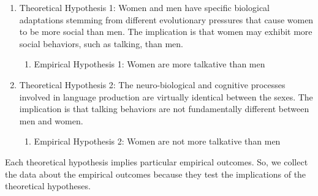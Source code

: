 \begin{enumerate}
\item Theoretical Hypothesis 1: Women and men have specific biological adaptations stemming from different evolutionary pressures that cause women to be more social than men. The implication is that women may exhibit more social behaviors, such as talking, than men.
	\begin{enumerate}
	\item Empirical Hypothesis 1: Women are more talkative than men
	\end{enumerate}
\item Theoretical Hypothesis 2: The neuro-biological and cognitive processes involved in language production are virtually identical between the sexes. The implication is that talking behaviors are not fundamentally different between men and women.
	\begin{enumerate}
	\item Empirical Hypothesis 2: Women are not more talkative than men
	\end{enumerate}
\end{enumerate}

Each theoretical hypothesis implies particular empirical outcomes. So, we collect the data about the empirical outcomes because they test the implications of the theoretical hypotheses.







